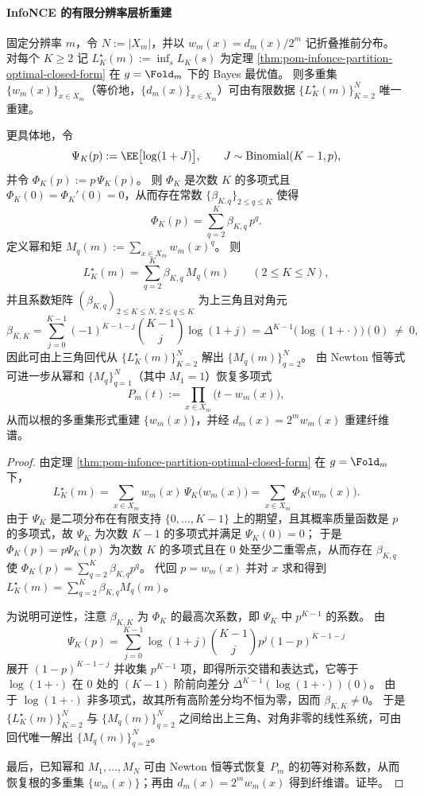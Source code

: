 \paragraph{InfoNCE 的有限分辨率层析重建}
\begin{theorem}\label{thm:pom-infonce-fiber-spectrum-tomography}
固定分辨率 \(m\)，令 \(N:=|X_m|\)，并以 \(w_m(x)=d_m(x)/2^m\) 记折叠推前分布。
对每个 \(K\ge 2\) 记
\(
L_K^\star(m):=\inf_s L_K(s)
\)
为定理 \ref{thm:pom-infonce-partition-optimal-closed-form} 在 \(g=\Fold_m\) 下的 Bayes 最优值。
则多重集 \(\{w_m(x)\}_{x\in X_m}\)（等价地，\(\{d_m(x)\}_{x\in X_m}\)）可由有限数据 \(\{L_K^\star(m)\}_{K=2}^{N}\) 唯一重建。
\par
更具体地，令
\[
\Psi_K(p):=\EE\bigl[\log(1+J)\bigr],\qquad J\sim\mathrm{Binomial}(K-1,p),
\]
并令 \(\Phi_K(p):=p\,\Psi_K(p)\)。
则 \(\Phi_K\) 是次数 \(K\) 的多项式且 \(\Phi_K(0)=\Phi_K'(0)=0\)，从而存在常数 \(\{\beta_{K,q}\}_{2\le q\le K}\) 使得
\[
\Phi_K(p)=\sum_{q=2}^{K}\beta_{K,q}\,p^q.
\]
定义幂和矩
\(
M_q(m):=\sum_{x\in X_m}w_m(x)^q
\)。
则
\[
L_K^\star(m)=\sum_{q=2}^{K}\beta_{K,q}\,M_q(m)\qquad(2\le K\le N),
\]
并且系数矩阵 \((\beta_{K,q})_{2\le K\le N,\,2\le q\le K}\) 为上三角且对角元
\[
\beta_{K,K}
=\sum_{j=0}^{K-1}(-1)^{K-1-j}\binom{K-1}{j}\log(1+j)
=\Delta^{K-1}\bigl(\log(1+\cdot)\bigr)(0)\ \neq\ 0,
\]
因此可由上三角回代从 \(\{L_K^\star(m)\}_{K=2}^{N}\) 解出 \(\{M_q(m)\}_{q=2}^{N}\)。
由 Newton 恒等式可进一步从幂和 \(\{M_q\}_{q=1}^{N}\)（其中 \(M_1=1\)）恢复多项式
\[
P_m(t):=\prod_{x\in X_m}\bigl(t-w_m(x)\bigr),
\]
从而以根的多重集形式重建 \(\{w_m(x)\}\)，并经 \(d_m(x)=2^m w_m(x)\) 重建纤维谱。
\end{theorem}
\begin{proof}
由定理 \ref{thm:pom-infonce-partition-optimal-closed-form} 在 \(g=\Fold_m\) 下，
\[
L_K^\star(m)=\sum_{x\in X_m}w_m(x)\,\Psi_K\!\bigl(w_m(x)\bigr)
=\sum_{x\in X_m}\Phi_K\!\bigl(w_m(x)\bigr).
\]
由于 \(\Psi_K\) 是二项分布在有限支持 \(\{0,\dots,K-1\}\) 上的期望，且其概率质量函数是 \(p\) 的多项式，故 \(\Psi_K\) 为次数 \(K-1\) 的多项式并满足 \(\Psi_K(0)=0\)；
于是 \(\Phi_K(p)=p\Psi_K(p)\) 为次数 \(K\) 的多项式且在 \(0\) 处至少二重零点，从而存在 \(\beta_{K,q}\) 使 \(\Phi_K(p)=\sum_{q=2}^{K}\beta_{K,q}p^q\)。
代回 \(p=w_m(x)\) 并对 \(x\) 求和得到
\(
L_K^\star(m)=\sum_{q=2}^{K}\beta_{K,q}M_q(m)
\)。
\par
为说明可逆性，注意 \(\beta_{K,K}\) 为 \(\Phi_K\) 的最高次系数，即 \(\Psi_K\) 中 \(p^{K-1}\) 的系数。
由
\[
\Psi_K(p)=\sum_{j=0}^{K-1}\log(1+j)\binom{K-1}{j}p^{j}(1-p)^{K-1-j}
\]
展开 \((1-p)^{K-1-j}\) 并收集 \(p^{K-1}\) 项，即得所示交错和表达式，它等于 \(\log(1+\cdot)\) 在 \(0\) 处的 \((K-1)\) 阶前向差分 \(\Delta^{K-1}(\log(1+\cdot))(0)\)。
由于 \(\log(1+\cdot)\) 非多项式，故其所有高阶差分均不恒为零，因而 \(\beta_{K,K}\neq 0\)。
于是 \(\{L_K^\star(m)\}_{K=2}^{N}\) 与 \(\{M_q(m)\}_{q=2}^{N}\) 之间给出上三角、对角非零的线性系统，可由回代唯一解出 \(\{M_q(m)\}_{q=2}^{N}\)。
\par
最后，已知幂和 \(M_1,\dots,M_N\) 可由 Newton 恒等式恢复 \(P_m\) 的初等对称系数，从而恢复根的多重集 \(\{w_m(x)\}\)；再由 \(d_m(x)=2^m w_m(x)\) 得到纤维谱。证毕。
\end{proof}

\endinput
